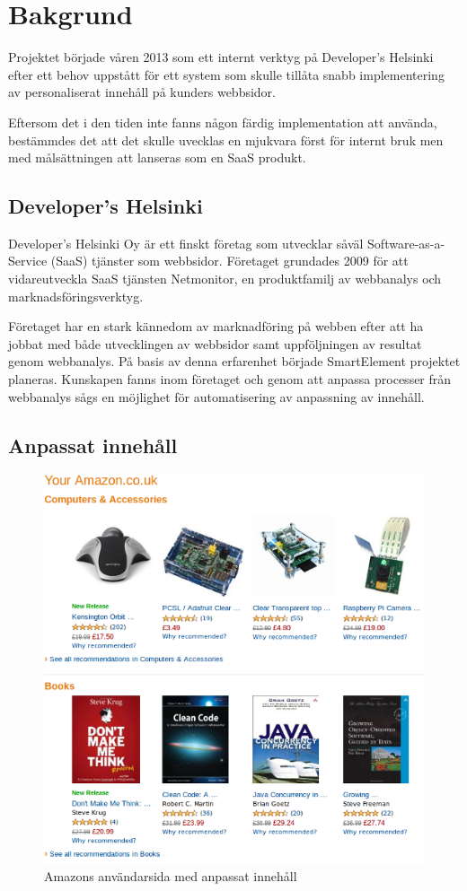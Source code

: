 \section{Bakgrund}

Projektet började våren 2013 som ett internt verktyg på Developer's Helsinki efter ett behov uppstått för ett system som skulle tillåta snabb implementering av personaliserat innehåll på kunders webbsidor.

Eftersom det i den tiden inte fanns någon färdig implementation att använda, bestämmdes det att det skulle uvecklas en mjukvara först för internt bruk men med målsättningen att lanseras som en SaaS produkt.

\subsection{Developer's Helsinki}

Developer's Helsinki Oy är ett finskt företag som utvecklar såväl Software-as-a-Service (SaaS) tjänster som webbsidor. Företaget grundades 2009 för att vidareutveckla  SaaS tjänsten Netmonitor, en produktfamilj av webbanalys och marknadsföringsverktyg.

Företaget har en stark kännedom av marknadföring på webben efter att ha jobbat med både utvecklingen av webbsidor samt uppföljningen av resultat genom webbanalys. På basis av denna erfarenhet började SmartElement projektet planeras. Kunskapen fanns inom företaget och genom att anpassa processer från webbanalys sågs en möjlighet för automatisering av anpassning av innehåll.

\subsection{Anpassat innehåll}

\begin{figure}[h!]
\centering
\includegraphics[width=120mm]{assets/images/amazon.png}
\caption{Amazons användarsida med anpassat innehåll}
\label{amazon}
\end{figure}

